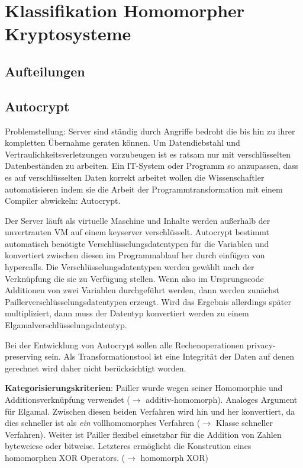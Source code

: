 \chapter{Klassifikation Homomorpher Kryptosysteme}
\label{KHK}
\section{Aufteilungen}
\section{Autocrypt} \cite{tople2013autocrypt}
\label{autocrypt}
Problemstellung: Server sind ständig durch Angriffe bedroht die bis hin zu ihrer kompletten Übernahme geraten können. Um Datendiebstahl und Vertraulichkeitsverletzungen vorzubeugen ist es ratsam nur mit verschlüsselten Datenbeständen zu arbeiten. Ein IT-System oder Programm so anzupassen, dass es auf verschlüsselten Daten korrekt arbeitet wollen die Wissenschaftler automatisieren indem sie die Arbeit der Programmtransformation mit einem Compiler abwickeln: Autocrypt.

Der Server läuft als virtuelle Maschine und Inhalte werden außerhalb der unvertrauten VM auf einem keyserver verschlüsselt. Autocrypt bestimmt automatisch benötigte Verschlüsselungsdatentypen für die Variablen und konvertiert zwischen diesen im Programmablauf her durch einfügen von hypercalls. Die Verschlüsselungsdatentypen werden gewählt nach der Verknüpfung die sie zu Verfügung stellen. Wenn also im Ursprungscode Additionen von zwei Variablen durchgeführt werden, dann werden zunächst Paillerverschlüsselungsdatentypen erzeugt. Wird das Ergebnis allerdings später multipliziert, dann muss der Datentyp konvertiert werden zu einem Elgamalverschlüsselungsdatentyp.

Bei der Entwicklung von Autocrypt sollen alle Rechenoperationen privacy-preserving sein. Als Transformationstool ist eine Integrität der Daten auf denen gerechnet wird daher nicht berücksichtigt worden.

\textbf{Kategorisierungskriterien}: Pailler wurde wegen seiner Homomorphie und Additionsverknüpfung verwendet ($\rightarrow$ additiv-homomorph). Analoges Argument für Elgamal. Zwischen diesen beiden Verfahren wird hin und her konvertiert, da dies schneller ist als \textit{ein} vollhomomorphes Verfahren ($\rightarrow$ Klasse schneller Verfahren). Weiter ist Pailler flexibel einsetzbar für die Addition von Zahlen byteweiese oder bitweise. Letzteres ermöglicht die Konstrution eines homomorphen XOR Operators. ($\rightarrow$ homomorph XOR)

